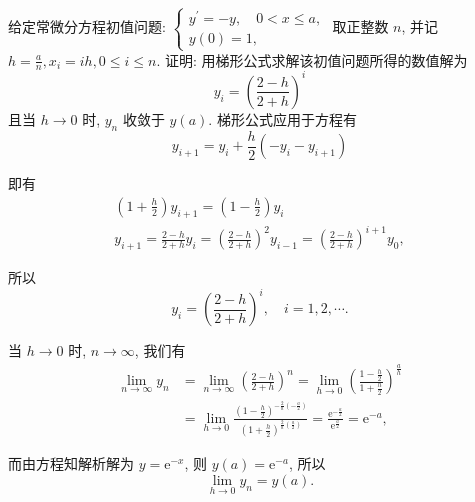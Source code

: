    \begin{tcolorbox}[enhanced,colback=8,colframe=7,breakable,coltitle=green!25!black,title=2024]
给定常微分方程初值问题:
$
\left\{\begin{array}{l}
y^{\prime}=-y, \quad 0<x \leqslant a, \\
y(0)=1,
\end{array}\right.
$
取正整数 $ n $, 并记 $ h=\frac a n, x_{i}=i h, 0 \leqslant i \leqslant n $. 证明: 用梯形公式求解该初值问题所得的数值解为
$$
y_{i}=\left(\frac{2-h}{2+h}\right)^{i}
$$
且当 $ h \rightarrow 0 $ 时, $ y_{n} $ 收敛于 $ y(a) $.
 \tcblower
 梯形公式应用于方程有
$$
y_{i+1}=y_{i}+\frac{h}{2}\left(-y_{i}-y_{i+1}\right)
$$

即有
$$
\begin{array}{c}
\left(1+\frac{h}{2}\right) y_{i+1}=\left(1-\frac{h}{2}\right) y_{i} \\
y_{i+1}=\frac{2-h}{2+h} y_{i}=\left(\frac{2-h}{2+h}\right)^{2} y_{i-1}=\left(\frac{2-h}{2+h}\right)^{i+1} y_{0},
\end{array}
$$

所以
$$
y_{i}=\left(\frac{2-h}{2+h}\right)^{i}, \quad i=1,2, \cdots .
$$

当 $ h \rightarrow 0 $ 时, $ n \rightarrow \infty $, 我们有
$$
\begin{aligned}
\lim _{n \rightarrow \infty} y_{n} & =\lim _{n \rightarrow \infty}\left(\frac{2-h}{2+h}\right)^{n}=\lim _{h \rightarrow 0}\left(\frac{1-\frac{h}{2}}{1+\frac{h}{2}}\right)^{\frac{a}{h}} \\
& =\lim _{h \rightarrow 0} \frac{\left(1-\frac{h}{2}\right)^{-\frac{2}{h}\left(-\frac{a}{2}\right)}}{\left(1+\frac{h}{2}\right)^{\frac{2}{h}\left(\frac{a}{2}\right)}}=\frac{\mathrm{e}^{-\frac{a}{2}}}{\mathrm{e}^{\frac{a}{2}}}=\mathrm{e}^{-a},
\end{aligned}
$$

而由方程知解析解为 $ y=\mathrm{e}^{-x} $, 则 $ y(a)=\mathrm{e}^{-a} $, 所以
$$
\lim _{h \rightarrow 0} y_{n}=y(a) .
$$
 \end{tcolorbox}


